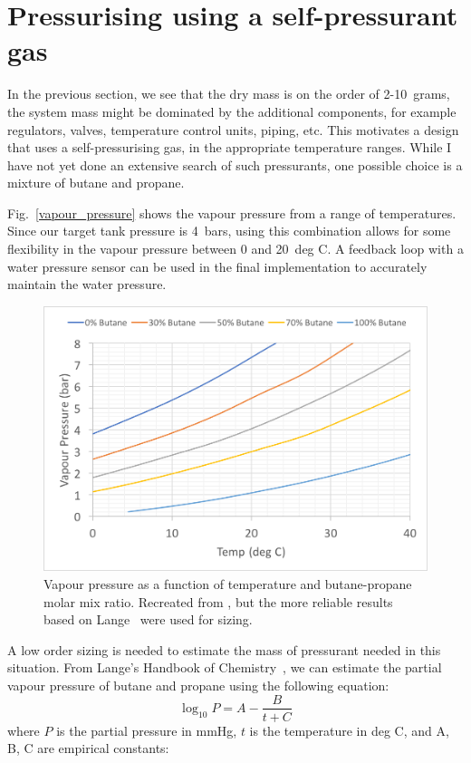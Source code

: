 \documentclass[12pt]{article}
\begin{document}
\section{Pressurising using a self-pressurant gas}


In the previous section, we see that the dry mass is on the order of 2-10~grams, the system mass might be dominated by the additional components, for example regulators, valves, temperature control units, piping, etc. This motivates a design that uses a self-pressurising gas, in the appropriate temperature ranges. While I have not yet done an extensive search of such pressurants, one possible choice is a mixture of butane and propane. 

Fig.~\ref{vapour_pressure} shows the vapour pressure from a range of temperatures. Since our target tank pressure is 4~bars, using this combination allows for some flexibility in the vapour pressure between 0 and 20~deg C. A feedback loop with a water pressure sensor can be used in the final implementation to accurately maintain the water pressure. 


\begin{figure}[htbp]
   \centering
   \includegraphics[width=0.7\linewidth]{vapour_pressure}
   \caption{Vapour pressure as a function of temperature and butane-propane molar mix ratio. Recreated from \cite{vapourPressure_engToolbox}, but the more reliable results based on Lange~\cite{lange} were used for sizing.}
   \label{fig:vapour_pressure}
\end{figure}

A low order sizing is needed to estimate the mass of pressurant needed in this situation. From Lange's Handbook of Chemistry~\cite{lange}, we can estimate the partial vapour pressure of butane and propane using the following equation:
\begin{equation}
\log_{10}{P} =   A - \frac{B}{t+C}
\end{equation}
where $P$ is the partial pressure in mmHg, $t$ is the temperature in deg C, and A, B, C are empirical constants:
\end{document}
